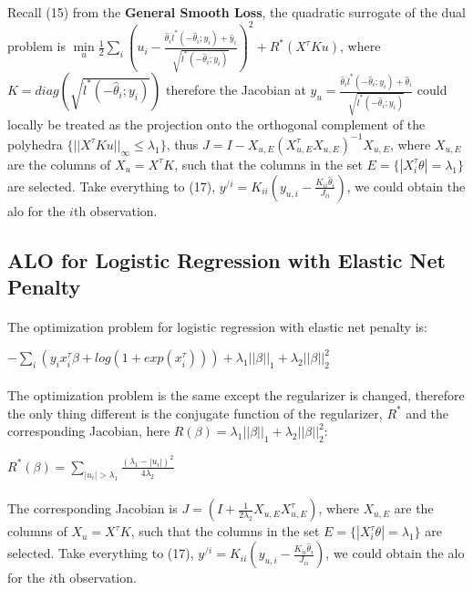 \documentclass{article}
\begin{document}
\paragraph{}Recall (15) from the \textbf{General Smooth Loss}, the quadratic surrogate of the dual problem is $\min\limits_{u} \frac{1}{2}\sum\limits_{i}(u_{i}-\frac{\hat{\theta}_{i}\ddot{l}^{*}(-\hat{\theta}_{i};y_{i})+\hat{y}_{i}}{\sqrt{\ddot{l}^{*}(-\hat{\theta}_{i};y_{i})}})^{2}+R^{*}(X^{\tau}Ku)$, where $K =diag(\sqrt{\ddot{l}^{*}(-\hat{\theta}_{i};y_{i})})$ therefore the Jacobian at $y_{u} = \frac{\hat{\theta}_{i}\ddot{l}^{*}(-\hat{\theta}_{i};y_{i})+\hat{\theta}_{i}}{\sqrt{\ddot{l}^{*}(-\hat{\theta}_{i};y_{i})}}$ could locally be treated as the projection onto the orthogonal complement of the polyhedra $\{||X^{\tau}Ku||_{\infty} \leq \lambda_{1}\}$, thus $J = I - X_{u,E}(X_{u,E}^{\tau}X_{u,E})^{-1}X_{u,E}$, where $X_{u,E}$ are the columns of $X_{u}=X^{\tau}K$, such that the columns in the set $E = \{|X_{i}^{\tau}\theta| = \lambda_{1}\}$ are selected. Take everything to (17), $y^{/i} = K_{ii}(y_{u,i}-\frac{K_{ii}\hat{\theta}_{i}}{J_{ii}})$, we could obtain the alo for the $i$th observation.
\subsection{ALO for Logistic Regression with Elastic Net Penalty}
\paragraph{}The optimization problem for logistic regression with elastic net penalty is:
\begin{center}
$-\sum\limits_{i}(y_{i}x_{i}^{\tau}\beta+log(1+exp(x_{i}^{\tau})))+\lambda_{1}||\beta||_{1}+\lambda_{2}||\beta||_{2}^{2}$
\end{center}
\paragraph{}The optimization problem is the same except the regularizer is changed, therefore the only thing different is the conjugate function of the regularizer, $R^{*}$ and the corresponding Jacobian, here $R(\beta) = \lambda_{1}||\beta||_{1}+\lambda_{2}||\beta||_{2}^{2}$:
\begin{center}
$R^{*}(\beta) = \sum\limits_{|u_{i}| > \lambda_{1}} \frac{(\lambda_{1}-|u_{i}|)^{2}}{4\lambda_{2}}$
\end{center}
\paragraph{}The corresponding Jacobian is $J = (I + \frac{1}{2\lambda_{2}}X_{u,E}X_{u,E}^{\tau})$, where $X_{u,E}$ are the columns of $X_{u}=X^{\tau}K$, such that the columns in the set $E = \{|X_{i}^{\tau}\theta| = \lambda_{1}\}$ are selected. Take everything to (17), $y^{/i} = K_{ii}(y_{u,i}-\frac{K_{ii}\hat{\theta}_{i}}{J_{ii}})$, we could obtain the alo for the $i$th observation.
\end{document}
